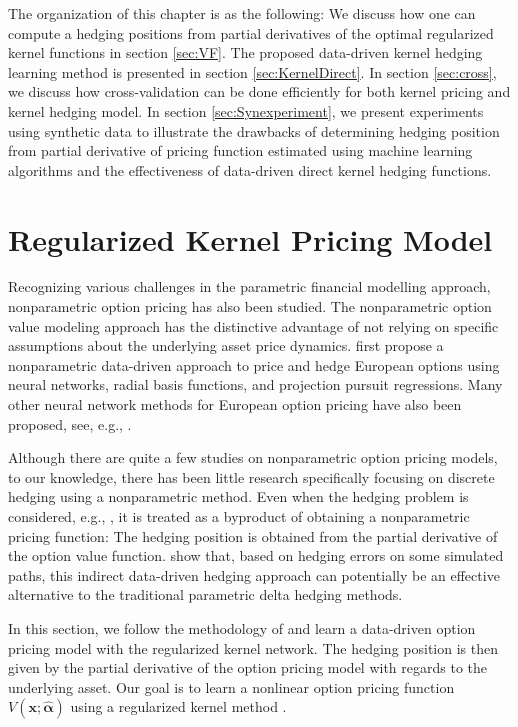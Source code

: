 \documentclass[letterpaper,12pt,titlepage,oneside,final]{book}
\numberwithin{equation}{section}
\theoremstyle{definition}
\newcommand{\vx}{\mathbf{x}}
\newcommand{\valpha}{\pmb{\widehat{\alpha}}}
\begin{document}
The organization of this chapter is as the following:
We discuss how one can compute a hedging positions from partial derivatives of the optimal regularized kernel functions in section \ref{sec:VF}. The proposed data-driven kernel hedging learning method is presented in section \ref{sec:KernelDirect}. In section \ref{sec:cross}, we discuss how cross-validation can be done efficiently for both kernel pricing and kernel hedging model. In section \ref{sec:Synexperiment}, we present experiments using synthetic data to illustrate the drawbacks of determining hedging position from partial derivative of pricing function estimated using machine learning algorithms and the effectiveness of data-driven direct kernel hedging functions.

\section{Regularized Kernel Pricing Model} 
\label{sec:RegularizedNW}
 Recognizing various challenges in the parametric financial modelling approach,
 nonparametric option pricing has also been studied. The nonparametric option value modeling approach has the distinctive advantage of not relying on specific assumptions about the underlying asset price dynamics. \citet{hutchinson} first propose a nonparametric data-driven approach to price and hedge European options using neural networks, radial basis functions, and projection pursuit regressions. Many other neural network methods for European option pricing have also been proposed, see, e.g., \citep{yao2000option,bennell2004black,gradojevic2009option,garcia2000pricing,malliaris1993neural}.


Although there are  quite a few studies on  nonparametric option pricing models, to our knowledge, there has been little research specifically focusing on discrete hedging using a nonparametric method. Even when the hedging problem is considered, e.g.,  \citep{hutchinson}, it is treated as a byproduct of obtaining a nonparametric  pricing function: The hedging position is obtained from the partial derivative of the option value function. \citet{hutchinson} show that, based on hedging errors on some simulated paths,  this indirect data-driven hedging approach can potentially be an effective alternative to the traditional parametric delta hedging methods.

In this section, we follow the methodology of \cite{hutchinson} and learn a data-driven option pricing model with the regularized kernel network. The hedging position is then given by the partial derivative of the option pricing model with regards to the underlying asset. Our goal is to learn a nonlinear option pricing function $V(\vx;\valpha)$  using a regularized kernel method \cite{evgeniou2000regularization}. 
\end{document}
